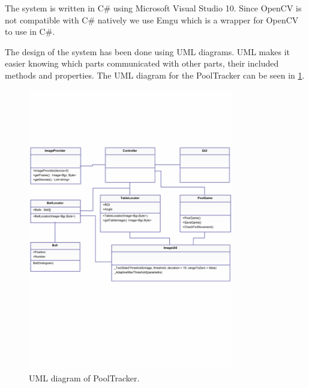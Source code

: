 The system is written in C\# using Microsoft Visual Studio 10. Since OpenCV\cite{opencv} is not compatible with C\# natively we use Emgu\cite{emgu} which is a wrapper for OpenCV to use in C\#. 

The design of the system has been done using UML diagrams. UML makes it easier knowing which parts communicated with other parts, their included methods and properties. The UML diagram for the PoolTracker can be seen in \ref{fig:uml}.

\begin{figure}[H]
\begin{center}
\leavevmode
\includegraphics[width=0.8\textwidth]{images/UML}
\end{center}
\caption{UML diagram of PoolTracker.}
\label{fig:uml}
\end{figure}

